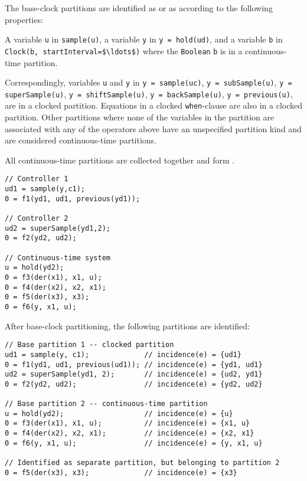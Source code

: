 The base-clock partitions are identified as  or as  according to the following properties:

A variable \lstinline!u! in \lstinline!sample(u)!, a variable \lstinline!y! in \lstinline!y = hold(ud)!, and a variable \lstinline!b! in \lstinline!Clock(b, startInterval=$\ldots$)! where the \lstinline!Boolean! \lstinline!b! is in a continuous-time partition.

Correspondingly, variables \lstinline!u! and \lstinline!y! in
\lstinline!y = sample(uc)!,
\lstinline!y = subSample(u)!,
\lstinline!y = superSample(u)!,
\lstinline!y = shiftSample(u)!,
\lstinline!y = backSample(u)!,
\lstinline!y = previous(u)!,
are in a clocked partition.
Equations in a clocked \lstinline!when!-clause are also in a clocked partition.
Other partitions where none of the variables in the partition are associated with any of the operators above have an unspecified partition kind and are considered continuous-time partitions.

All continuous-time partitions are collected together and form .

\begin{example}
\begin{lstlisting}[language=modelica]
// Controller 1
ud1 = sample(y,c1);
0 = f1(yd1, ud1, previous(yd1));

// Controller 2
ud2 = superSample(yd1,2);
0 = f2(yd2, ud2);

// Continuous-time system
u = hold(yd2);
0 = f3(der(x1), x1, u);
0 = f4(der(x2), x2, x1);
0 = f5(der(x3), x3);
0 = f6(y, x1, u);
\end{lstlisting}

After base-clock partitioning, the following partitions are identified:
\begin{lstlisting}[language=modelica]
// Base partition 1 -- clocked partition
ud1 = sample(y, c1);             // incidence(e) = {ud1}
0 = f1(yd1, ud1, previous(ud1)); // incidence(e) = {yd1, ud1}
ud2 = superSample(yd1, 2);       // incidence(e) = {ud2, yd1}
0 = f2(yd2, ud2);                // incidence(e) = {yd2, ud2}

// Base partition 2 -- continuous-time partition
u = hold(yd2);                   // incidence(e) = {u}
0 = f3(der(x1), x1, u);          // incidence(e) = {x1, u}
0 = f4(der(x2), x2, x1);         // incidence(e) = {x2, x1}
0 = f6(y, x1, u);                // incidence(e) = {y, x1, u}

// Identified as separate partition, but belonging to partition 2
0 = f5(der(x3), x3);             // incidence(e) = {x3}
\end{lstlisting}
\end{example}

